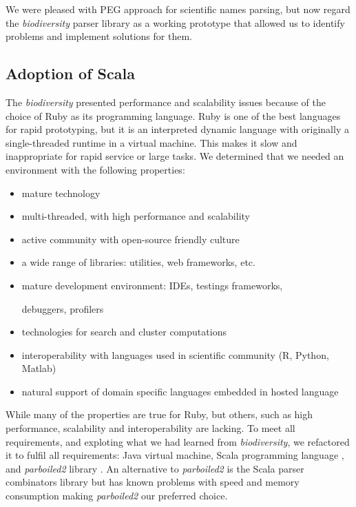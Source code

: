 \documentclass{bmcart}
\begin{document}
We were pleased with PEG approach for scientific names parsing, but now regard
the \textit{biodiversity} parser library as a working prototype that allowed us
to identify  problems and implement solutions for them.

\subsection*{Adoption of Scala}

The \textit{biodiversity} presented performance and scalability issues because
of the choice of Ruby as its programming language. Ruby is one of the best
languages for rapid prototyping, but it is an interpreted dynamic language with
originally a single-threaded runtime in a virtual machine. This makes it slow
and inappropriate for rapid service or large tasks. We determined that we
needed an environment with the following properties:

\begin{itemize}

    \item mature technology

    \item multi-threaded, with high performance and scalability

    \item active community with open-source friendly culture

    \item a wide range of libraries: utilities, web frameworks, etc.

    \item mature development environment: IDEs, testings frameworks,

    debuggers, profilers
    \item technologies for search and cluster computations

    \item interoperability with languages used in scientific community (R,
    Python, Matlab)

    \item natural support of domain specific languages embedded in hosted
    language

\end{itemize}


While many of the properties are true for Ruby, but others, such as high
performance, scalability and interoperability are lacking. To meet all
requirements, and exploting what we had learned from \textit{biodiversity}, we
refactored it to fulfil all requirements: Java virtual machine, Scala
programming language \cite{odersky2004overview}, and \textit{parboiled2}
library \cite{parboiled2}.  An alternative to \textit{parboiled2} is the Scala
parser combinators library \cite{moors2008parser} but has known problems with
speed and memory consumption making \textit{parboiled2} our preferred choice.
\end{document}
